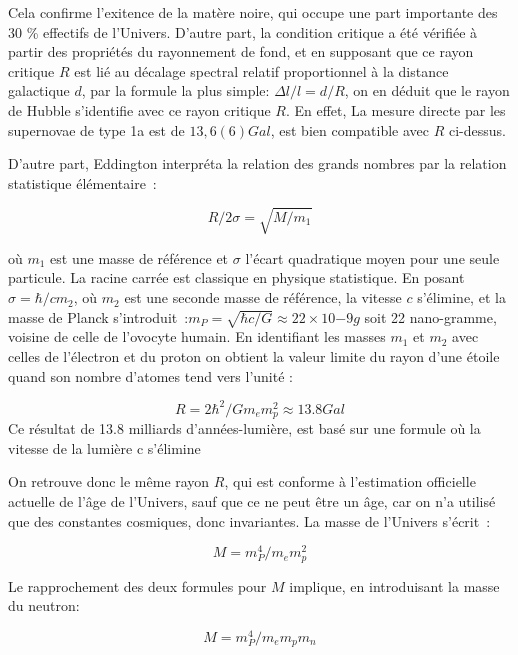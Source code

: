 \documentclass[a4paper,12pt]{article}
\begin{document}
Cela confirme l'exitence de la matère noire, qui occupe une part importante des 30 \% effectifs de l'Univers. D'autre part, la condition critique a été vérifiée à partir des propriétés du rayonnement de fond, et en supposant que ce rayon critique $R$ est lié au décalage spectral relatif proportionnel à la distance galactique $d$, par la formule la plus simple: $\Delta l/l = d/R$, on en déduit que le rayon de Hubble s'identifie avec ce rayon critique  $R$. En effet, La mesure directe par les supernovae de type 1a est de  $13,6(6) Gal$, est bien compatible avec $R$ ci-dessus.

D'autre part, Eddington interpréta la relation des grands nombres par la relation statistique élémentaire :

\begin{equation}
R/2 \sigma = \sqrt{M/m_1}
\end{equation}


où $m_1$ est une masse de référence et $\sigma$ l'écart quadratique moyen pour une seule particule. La racine carrée est classique en physique statistique. En posant $\sigma  = \hbar /cm_2$, où $m_2$ est une seconde masse de référence, la vitesse $c$ s'élimine, et la masse de Planck s'introduit :$ m_P  = \sqrt{\hbar c/G} \approx 22 \times 10{-9}g$ soit 22 nano-gramme, voisine de celle de l'ovocyte humain. En identifiant les masses $m_1$ et $m_2$ avec celles de l'électron et du proton on obtient la valeur limite du rayon d'une étoile quand son nombre d'atomes tend vers l'unité : 

\begin{equation}
R = 2\hbar^2/Gm_em_p^2 \approx 13.8 Gal 
\end{equation}
Ce résultat de 13.8 milliards d'années-lumière, est basé sur une formule où la vitesse de la lumière c s'élimine 

On retrouve donc le même rayon $R$, qui est conforme à l'estimation officielle actuelle de l'âge de l'Univers, sauf que ce ne peut être un âge, car on n'a utilisé que des constantes cosmiques, donc invariantes. La masse de l'Univers s'écrit :

\begin{equation}
M = m_P^4/m_em_p^2
\end{equation}

Le rapprochement des deux formules pour $M$ implique, en introduisant la masse du neutron:

\begin{equation}
M = m_P^4/m_em_pm_n
\end{equation}
\end{document}
